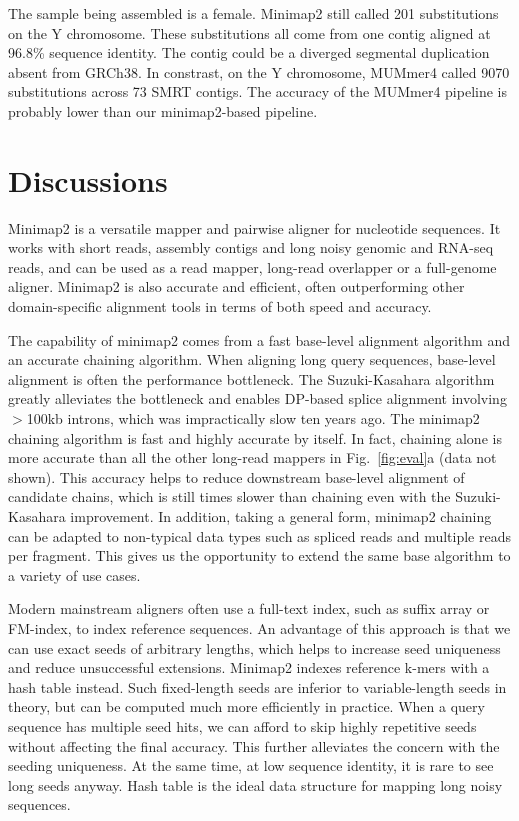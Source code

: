 \documentclass{bioinfo}
\begin{document}
The sample being assembled is a female. Minimap2 still called 201 substitutions
on the Y chromosome. These substitutions all come from one contig aligned at
96.8\% sequence identity. The contig could be a diverged segmental duplication
absent from GRCh38. In constrast, on the Y chromosome, MUMmer4 called 9070
substitutions across 73 SMRT contigs. The accuracy of the MUMmer4 pipeline is
probably lower than our minimap2-based pipeline.

\section{Discussions}

Minimap2 is a versatile mapper and pairwise aligner for nucleotide sequences.
It works with short reads, assembly contigs and long noisy genomic and RNA-seq
reads, and can be used as a read mapper, long-read overlapper or a full-genome
aligner. Minimap2 is also accurate and efficient, often outperforming other
domain-specific alignment tools in terms of both speed and accuracy.

The capability of minimap2 comes from a fast base-level alignment algorithm and
an accurate chaining algorithm. When aligning long query sequences, base-level
alignment is often the performance bottleneck. The Suzuki-Kasahara algorithm
greatly alleviates the bottleneck and enables DP-based splice alignment
involving $>$100kb introns, which was impractically slow ten years ago.  The
minimap2 chaining algorithm is fast and highly accurate by itself.  In fact,
chaining alone is more accurate than all the other long-read mappers in
Fig.~\ref{fig:eval}a (data not shown). This accuracy helps to reduce downstream
base-level alignment of candidate chains, which is still times slower than
chaining even with the Suzuki-Kasahara improvement. In addition, taking a
general form, minimap2 chaining can be adapted to non-typical data types such as
spliced reads and multiple reads per fragment. This gives us the opportunity to
extend the same base algorithm to a variety of use cases.

Modern mainstream aligners often use a full-text index, such as suffix array or
FM-index, to index reference sequences. An advantage of this approach is that
we can use exact seeds of arbitrary lengths, which helps to increase seed
uniqueness and reduce unsuccessful extensions. Minimap2 indexes reference
k-mers with a hash table instead. Such fixed-length seeds are inferior to
variable-length seeds in theory, but can be computed much more efficiently in
practice. When a query sequence has multiple seed hits, we can afford to skip
highly repetitive seeds without affecting the final accuracy. This further
alleviates the concern with the seeding uniqueness. At the same time, at low
sequence identity, it is rare to see long seeds anyway. Hash table is the ideal
data structure for mapping long noisy sequences.
\end{document}
